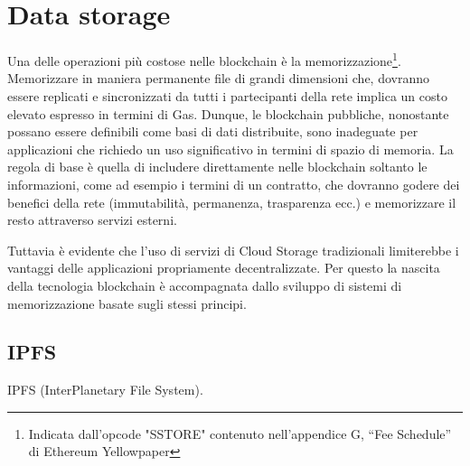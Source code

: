 \section{Data storage}

Una delle operazioni più costose nelle blockchain è la memorizzazione\footnote{Indicata dall'opcode "SSTORE" contenuto nell'appendice G, “Fee Schedule” di Ethereum Yellowpaper}. Memorizzare in maniera permanente file di grandi dimensioni che, dovranno essere replicati e sincronizzati da tutti i partecipanti della rete implica un costo elevato espresso in termini di Gas. Dunque, le blockchain pubbliche, nonostante possano essere definibili come basi di dati distribuite, sono inadeguate per applicazioni che richiedo un uso significativo in termini di spazio di memoria. La regola di base è quella di includere direttamente nelle blockchain soltanto le informazioni, come ad esempio i termini di un contratto, che dovranno godere dei benefici della rete (immutabilità, permanenza, trasparenza ecc.) e memorizzare il resto attraverso servizi esterni.

Tuttavia è evidente che l'uso di servizi di Cloud Storage tradizionali limiterebbe i vantaggi delle applicazioni propriamente decentralizzate. Per questo la nascita della tecnologia blockchain è accompagnata dallo sviluppo di sistemi di memorizzazione basate sugli stessi principi.

\subsection{IPFS}

IPFS (InterPlanetary File System).